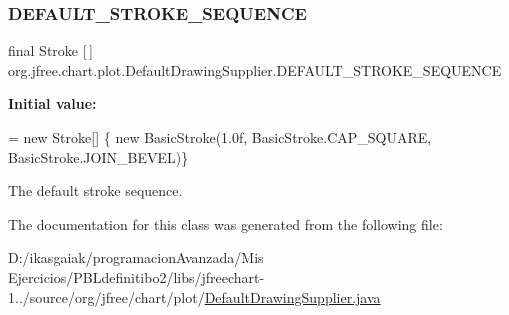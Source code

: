 \subsubsection{\texorpdfstring{D\+E\+F\+A\+U\+L\+T\+\_\+\+S\+T\+R\+O\+K\+E\+\_\+\+S\+E\+Q\+U\+E\+N\+CE}{DEFAULT\_STROKE\_SEQUENCE}}
{\footnotesize\ttfamily final Stroke \mbox{[}$\,$\mbox{]} org.\+jfree.\+chart.\+plot.\+Default\+Drawing\+Supplier.\+D\+E\+F\+A\+U\+L\+T\+\_\+\+S\+T\+R\+O\+K\+E\+\_\+\+S\+E\+Q\+U\+E\+N\+CE\hspace{0.3cm}{\ttfamily [static]}}

{\bfseries Initial value\+:}
\begin{DoxyCode}
= \textcolor{keyword}{new} Stroke[] \{
            \textcolor{keyword}{new} BasicStroke(1.0f, BasicStroke.CAP\_SQUARE,
                    BasicStroke.JOIN\_BEVEL)\}
\end{DoxyCode}
The default stroke sequence. 

The documentation for this class was generated from the following file\+:\begin{DoxyCompactItemize}
\item 
D\+:/ikasgaiak/programacion\+Avanzada/\+Mis Ejercicios/\+P\+B\+Ldefinitibo2/libs/jfreechart-\/1../source/org/jfree/chart/plot/\mbox{\hyperlink{_default_drawing_supplier_8java}{Default\+Drawing\+Supplier.\+java}}\end{DoxyCompactItemize}
